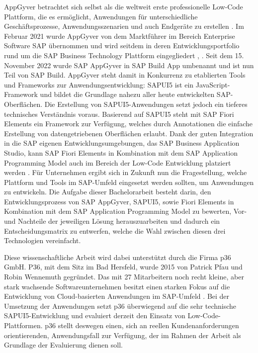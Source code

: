 AppGyver betrachtet sich selbst als die weltweit erste professionelle Low-Code Plattform, die es ermöglicht, Anwendungen für unterschiedliche Geschäftsprozesse, Anwendungsszenarien und auch Endgeräte zu erstellen \cite{lcnc:appgyv}. Im Februar 2021 wurde AppGyver von dem Marktführer im Bereich Enterprise Software SAP übernommen und wird seitdem in deren Entwicklungsportfolio rund um die SAP Business Technology Plattform eingegliedert \cite{lcnc:ncp}, \cite{lcnc:appgyvint}. Seit dem 15. November 2022 wurde SAP AppGyver in SAP Build App umbenannt und ist nun Teil von SAP Build. AppGyver steht damit in Konkurrenz zu etablierten Tools und Frameworks zur Anwendungsentwicklung: SAPUI5 ist ein JavaScript-Framework und bildet die Grundlage nahezu aller heute entwickelten SAP-Oberflächen. Die Erstellung von SAPUI5-Anwendungen setzt jedoch ein tieferes technisches Verständnis voraus. Basierend auf SAPUI5 steht mit SAP Fiori Elements ein Framework zur Verfügung, welches durch Annotationen die einfache Erstellung von datengetriebenen Oberflächen erlaubt. Dank der guten Integration in die SAP eigenen Entwicklungsumgebungen, das SAP Business Application Studio, kann SAP Fiori Elements in Kombination mit dem SAP Application Programming Model auch im Bereich der Low-Code Entwicklung platziert werden \cite{lcnc:fiori}. Für Unternehmen ergibt sich in Zukunft nun die Fragestellung, welche Plattform und Tools im SAP-Umfeld eingesetzt werden sollten, um Anwendungen zu entwickeln. Die Aufgabe dieser Bachelorarbeit besteht darin, den Entwicklungsprozess von SAP AppGyver, SAPUI5, sowie Fiori Elements in Kombination mit dem SAP Application Programming Model zu bewerten, Vor- und Nachteile der jeweiligen Lösung herauszuarbeiten und dadurch ein Entscheidungsmatrix zu entwerfen, welche die Wahl zwischen diesen drei Technologien vereinfacht.

Diese wissenschaftliche Arbeit wird dabei unterstützt durch die Firma p36 GmbH. P36, mit dem Sitz im Bad Hersfeld, wurde 2015 von Patrick Pfau und Robin Wennemuth gegründet. Das mit 27 Mitarbeitern noch recht kleine, aber stark wachsende Softwareunternehmen besitzt einen starken Fokus auf die Entwicklung von Cloud-basierten Anwendungen im SAP-Umfeld \cite{lcnc:p36}.  Bei der Umsetzung der Anwendungen setzt p36 überwiegend auf die sehr technische SAPUI5-Entwicklung und evaluiert derzeit den Einsatz von Low-Code-Plattformen. p36 stellt deswegen einen, sich an reellen Kundenanforderungen orientierenden, Anwendungsfall zur Verfügung, der im Rahmen der Arbeit als Grundlage der Evaluierung dienen soll. 


